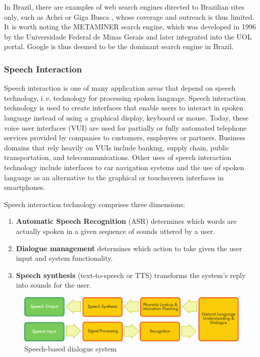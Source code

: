 \begin{multicols}{2}
In Brazil, there are examples of web search engines directed to Brazilian sites only, such as Achei \cite{achei} or Giga Busca \cite{busca}, 
whose coverage and outreach is thus limited. It is worth noting the METAMINER search engine, 
which was developed in 1996 by the Universidade Federal de Minas Gerais and later integrated into the UOL portal.
Google is thus deemed to be the dominant search engine in Brazil. 

\subsubsection{Speech Interaction}

Speech interaction is one of many application areas that depend on speech technology, i.\,e. technology for processing spoken language. 
Speech interaction technology is used to create interfaces that enable users to interact in spoken language instead of using a graphical display, keyboard or mouse.  Today, these voice user interfaces (VUI) are used for partially or fully automated telephone services provided by companies to customers, employees or partners. Business domains that rely heavily on VUIs include banking, supply chain, public transportation, and telecommunications. Other uses of speech interaction technology include interfaces to car navigation systems and the use of spoken language as an alternative to the graphical or touchscreen interfaces in smartphones.


Speech interaction technology comprises three dimensions: 

\begin{enumerate}
\item \textbf{Automatic Speech Recognition} (ASR) determines which words are actually spoken in a given sequence of sounds uttered by a user.  
\item \textbf{Dialogue management} determines which action to take given the user input and system functionality.   
\item \textbf{Speech synthesis} (text-to-speech or TTS) transforms the system’s reply into sounds for the user.
\end{enumerate}

\begin{figure}[htb]
  \center
  \includegraphics[width=\textwidth]{../_media/english/simple_speech-based_dialogue_architecture}
  \caption{Speech-based dialogue system}
  \label{fig:dialoguearch_en}
\end{figure}


\end{multicols}
